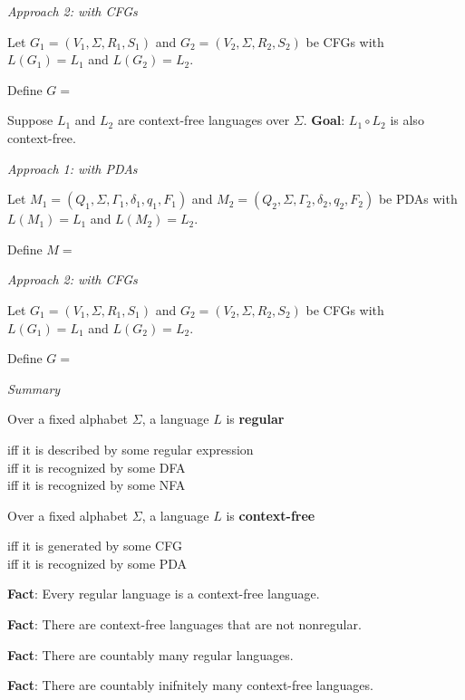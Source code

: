 \documentclass[12pt, oneside]{article}
\begin{document}
{\it Approach  2: with CFGs}

Let $G_1 = (V_1, \Sigma, R_1, S_1)$  and   $G_2 = (V_2, \Sigma, R_2, S_2)$  be CFGs  with
$L(G_1) =  L_1$  and  $L(G_2) = L_2$.

Define $G = $

\vfill

\newpage
Suppose $L_1$ and $L_2$ are context-free languages over $\Sigma$.  {\bf Goal}:  $L_1 \circ L_2$  is  also context-free.


{\it Approach 1: with  PDAs}

Let $M_1 = ( Q_1, \Sigma, \Gamma_1, \delta_1, q_1, F_1)$ and
$M_2 = ( Q_2, \Sigma, \Gamma_2, \delta_2, q_2, F_2)$ be PDAs with 
$L(M_1) =  L_1$  and  $L(M_2) = L_2$.

Define $M = $

\vfill

{\it Approach  2: with CFGs}

Let $G_1 = (V_1, \Sigma, R_1, S_1)$  and   $G_2 = (V_2, \Sigma, R_2, S_2)$  be CFGs  with
$L(G_1) =  L_1$  and  $L(G_2) = L_2$.

Define $G = $

\vfill
\newpage
{\it Summary}

Over a fixed alphabet $\Sigma$, a language $L$ is {\bf regular}

\vspace{-20pt}
\begin{center}
    iff it is described by some regular expression \\
    iff it is recognized by some DFA\\
    iff it is recognized by some NFA
\end{center}

Over a fixed alphabet $\Sigma$, a language $L$ is {\bf context-free}

\vspace{-20pt}
\begin{center}
    iff it is generated by some CFG\\
    iff it is recognized by some PDA
\end{center}

{\bf Fact}: Every regular language is a context-free language.

{\bf Fact}: There are context-free languages that are not nonregular.

{\bf Fact}: There are countably many regular languages.

{\bf Fact}: There are countably inifnitely many context-free languages.
\end{document}
